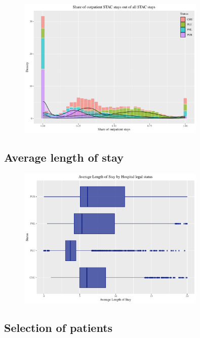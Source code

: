 \begin{figure}[!htb]
    \centering
    \includegraphics[width=0.8\textwidth]{../../Figures/2016-2022/STAC_share_all.pdf}
\end{figure}
\clearpage
\subsection{Average length of stay}


\begin{figure}[!htb]
    \centering
    \includegraphics[width=0.8\textwidth]{../../Figures/2016-2022/ALOS.pdf}
\end{figure}
\clearpage
\subsection{Selection of patients}


